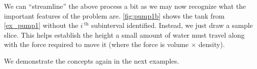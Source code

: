 We can ``streamline'' the above process a bit as we may now recognize what the important features of the problem are. \autoref{fig:pump1b} shows the tank from \autoref{ex_pump1} without the $i\,^\text{th}$ subinterval identified. Instead, we just draw a sample slice. This helps establish the height a small amount of water must travel along with the force required to move it (where the force is volume $\times$ density).

We demonstrate the concepts again in the next examples.

